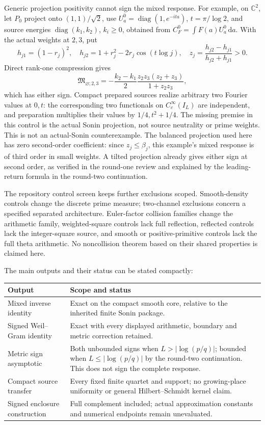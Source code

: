 \documentclass[11pt]{article}
\theoremstyle{remark}
\newcommand{\C}{\mathbb C}
\newcommand{\dd}{\,\mathrm d}
\DeclareMathOperator{\diag}{diag}
\numberwithin{equation}{section}
\begin{document}
Generic projection positivity cannot sign the mixed response. For example,
on \(\C^2\), let \(P_0\) project onto \((1,1)/\sqrt2\), use
\(U_a^0=\diag(1,e^{-ita})\), \(t=\pi/\log2\), and source energies
\(\diag(k_1,k_2)\), \(k_i\ge0\), obtained from
\(C_F^0=\int F(a)U_a^0\dd a\). With the actual weights at \(2,3\), put
\[
 h_{j1}=(1-r_j)^2,\quad
 h_{j2}=1+r_j^2-2r_j\cos(t\log j),\quad
 z_j=\frac{h_{j2}-h_{j1}}{h_{j2}+h_{j1}}>0 .
\]
Direct rank-one compression gives
\[
 \mathfrak M_{\varnothing;2,3}
 =-\frac{k_2-k_1}{2}
        \frac{z_2z_3(z_2+z_3)}{1+z_2z_3},
\]
which has either sign. Compact prepared sources realize arbitrary two
Fourier values at \(0,t\): the corresponding two functionals on
\(C_c^\infty(I_L)\) are independent, and preparation multiplies their
values by \(1/4,t^2+1/4\). The missing premise in this control is the
actual Sonin projection, not source neutrality or prime weights.
This is not an actual-Sonin counterexample. The balanced projection used
here has zero second-order coefficient: since \(z_j\le\beta_j\), this
example's mixed response is of third order in small weights. A tilted
projection already gives either sign at second order, as verified in the
round-one review and explained by the leading-return formula in the
round-two continuation.

The repository control screen \cite{controls} keeps further exclusions
scoped. Smooth-density controls change the discrete prime measure;
two-channel exclusions concern a specified separated architecture.
Euler-factor collision families change the arithmetic family,
weighted-square controls lack full reflection, reflected controls lack
the integer-square source, and smooth or positive-primitive controls
lack the full theta arithmetic. No noncollision theorem based on their
shared properties is claimed here.

The main outputs and their status can be stated compactly:
\begin{center}
\small
\begin{tabularx}{\textwidth}{@{}p{}X@{}}
\toprule
Output & Scope and status\\
\midrule
Mixed inverse identity & Exact on the compact smooth core, relative to
the inherited finite Sonin package.\\
Signed Weil--Gram identity & Exact with every displayed arithmetic,
boundary and metric correction retained.\\
Metric sign asymptotic & Both unbounded signs when \(L>|\log(p/q)|\);
bounded when \(L\le|\log(p/q)|\) by the round-two continuation.
This does not sign the complete response.\\
Compact source transfer & Every fixed finite quartet and support;
no growing-place uniformity or general Hilbert--Schmidt kernel claim.\\
Signed enclosure construction & Full complement included; actual
approximation constants and numerical endpoints remain unevaluated.\\
\bottomrule
\end{tabularx}
\end{center}
\end{document}
